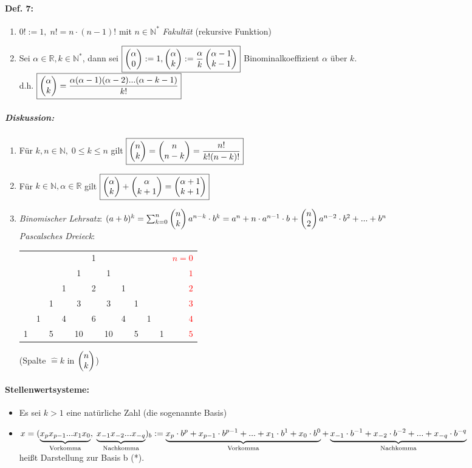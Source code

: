 \paragraph{Def. 7:}
\begin{enumerate}[label=\alph*.)]
\item $\boxed{0! := 1, \; n!=n\cdot (n-1)!}$ mit $n\in \mathbb{N}^*$ \emph{Fakultät} (rekursive Funktion)
\item Sei $\alpha \in \mathbb{R}, k\in \mathbb{N}^*$, dann sei $\boxed{\begin{pmatrix}\alpha\\0\end{pmatrix}:=1, \begin{pmatrix}\alpha\\k\end{pmatrix}:= \frac{\alpha}{k}\begin{pmatrix}\alpha-1\\k-1\end{pmatrix}}$ Binominalkoeffizient $\alpha$ über $k$.\\
d.h. $\boxed{\begin{pmatrix}\alpha\\k\end{pmatrix}= \frac{\alpha(\alpha-1)(\alpha-2)...(\alpha-k-1)}{k!}}$
\end{enumerate}

\subparagraph{Diskussion:}
\begin{enumerate}
\item Für $k, n \in \mathbb{N}, \; 0 \leq k \leq n$ gilt $\boxed{\begin{pmatrix}n\\k\end{pmatrix}=\begin{pmatrix}n\\n-k\end{pmatrix}=\frac{n!}{k!(n-k)!}}$
\item Für $k \in \mathbb{N}, \alpha \in \mathbb{R}$ gilt $\boxed{\begin{pmatrix}\alpha\\k\end{pmatrix}+\begin{pmatrix}\alpha\\k+1\end{pmatrix}=\begin{pmatrix}\alpha+1\\k+1\end{pmatrix}}$
\item \emph{Binomischer Lehrsatz}: $(a+b)^k=\sum_{k=0}^n \begin{pmatrix}n\\k\end{pmatrix} a^{n-k} \cdot b^k=a^n+n\cdot a^{n-1} \cdot b + \begin{pmatrix}n\\2\end{pmatrix}a^{n-2}\cdot b^2+...+b^n$\\
\emph{Pascalsches Dreieck}:
\begin{tabular}{c c c c c c c c c c c r}
   &   &   &   &   & 1 &   &   &   &   &   & \textcolor{red}{$n=0$} \\
   &   &   &   & 1 &   & 1 &   &   &   &   & \textcolor{red}{$1$} \\
   &   &   & 1 &   & 2 &   & 1 &   &   &   & \textcolor{red}{$2$} \\
   &   & 1 &   & 3 &   & 3 &   & 1 &   &   & \textcolor{red}{$3$} \\
   & 1 &   & 4 &   & 6 &   & 4 &   & 1 &   & \textcolor{red}{$4$} \\
 1 &   & 5 &   & 10&   & 10&   & 5 &   & 1 & \textcolor{red}{$5$} \\

\end{tabular}
(Spalte $\widehat{=}k$ in $\begin{pmatrix}n\\k\end{pmatrix}$)
\end{enumerate}

\paragraph{Stellenwertsysteme:}
\begin{itemize}
\item Es sei $k>1$ eine natürliche Zahl (die sogenannte Basis)
\item $x = (\underbrace{x_p x_{p-1}...x_1x_0}_{\text{Vorkomma}},\;\underbrace{x_{-1}x_{-2}...x_{-q}}_{\text{Nachkomma}})_b\\
:= \underbrace{x_p\cdot b^p+x_{p-1}\cdot b^{p-1}+...+x_1\cdot b^1+x_0\cdot b^0}_{\text{Vorkomma}}+\underbrace{x_{-1}\cdot b^{-1}+x_{-2}\cdot b^{-2}+...+x_{-q}\cdot b^{-q}}_{\text{Nachkomma}}$\\
heißt Darstellung zur Basis b (*).
\end{itemize}

